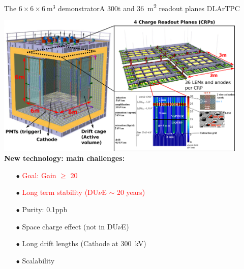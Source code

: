 \documentclass[10pt]{beamer}
\begin{document}
    \begin{frame}{The \texorpdfstring{$6 \times 6 \times \SI{6}{\meter\cubed}$}{666}
    		demonstrator}{A 300t and \SI{36}{\meter\squared} readout planes DLArTPC}
    	\begin{scriptsize}
    			\includegraphics[width=0.9\textwidth]{figures/666/666_full.png}\\
    			\vfill
    			\textbf{New technology: main challenges:}\\
    			\begin{minipage}{0.32\textwidth}
    				\begin{itemize}
    					\item[$\bullet$] \textcolor{red}{Goal: Gain $\geq$ 20}
    					\item[$\bullet$] \textcolor{red}{Long term stability (DU$\nu$E $\sim$ 20 years)}
    				\end{itemize}
    			\end{minipage}\hfill
    			\begin{minipage}{0.32\textwidth}
    				\begin{itemize}
    					\item[$\bullet$] Purity: 0.1\;ppb
    					\item[$\bullet$] Space charge effect
    					(not in DU$\nu$E)
    				\end{itemize}
	    		\end{minipage}\hfill
	    		\begin{minipage}{0.32\textwidth}
	    			\begin{itemize}
	    				\item[$\bullet$] Long drift lengths (Cathode at \SI{300}{\kilo\volt})
	    				\item[$\bullet$] Scalability
	    			\end{itemize}
	    		\end{minipage}
    	\end{scriptsize} 
    \end{frame}
    
\end{document}
